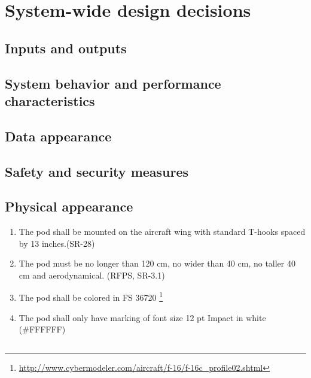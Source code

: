 \documentclass[Main]{subfiles}
\begin{document}
\setcounter{chapter}{2}
\chapter{System-wide design decisions}


\section{Inputs and outputs}

\section{System behavior and performance characteristics}

\section{Data appearance}

\section{Safety and security measures}

\section{Physical appearance}
\begin{enumerate}[{}-1]
\setcounter{enumi}{0}
\item The pod shall be mounted on the aircraft wing with standard T-hooks spaced by 13 inches.(SR-28)

\item The pod must be no longer than 120 cm, no wider than 40 cm, no taller 40 cm and aerodynamical. (RFPS, SR-3.1)

\item The pod shall be colored in FS 36720 \footnote{\url{http://www.cybermodeler.com/aircraft/f-16/f-16c_profile02.shtml}}

\item The pod shall only have marking of font size 12 pt Impact in white (\#FFFFFF)

\end{enumerate}


\section{}
\end{document}
